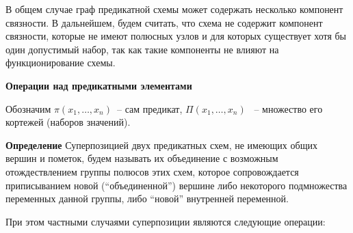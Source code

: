 \documentclass[12pt]{article}
\begin{document}
В общем случае граф предикатной схемы может содержать несколько компонент связности. 
В дальнейшем, будем считать, что схема не содержит компонент связности, 
которые не имеют полюсных узлов и для которых существует хотя бы один допустимый набор, так как такие компоненты не влияют на функционирование схемы.

\textbf{Операции над предикатными элементами}

Обозначим $\pi(x_1, \dots, x_n)$~-- сам предикат, 
$\Pi(x_1, \dots, x_n)$ ~-- множество его кортежей (наборов значений).

\textbf{Определение} Суперпозицией двух предикатных схем, не имеющих общих вершин и пометок, 
будем называть их объединение с возможным отождествлением группы полюсов этих схем, 
которое сопровождается приписыванием новой (``объединенной'') вершине либо 
некоторого подмножества переменных данной группы, либо ``новой'' внутренней переменной.

При этом частными случаями суперпозиции являются следующие операции:
\end{document}
